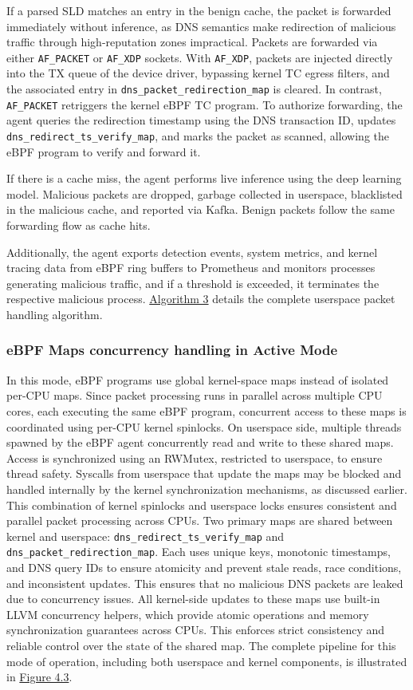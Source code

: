\documentclass [11pt, proquest] {uwthesis}[2020/02/24]
\begin{document}
If a parsed SLD matches an entry in the benign cache, the packet is forwarded immediately without inference, as DNS semantics make redirection of malicious traffic through high-reputation zones impractical. Packets are forwarded via either \texttt{AF\_PACKET} or \texttt{AF\_XDP} sockets. With \texttt{AF\_XDP}, packets are injected directly into the TX queue of the device driver, bypassing kernel TC egress filters, and the associated entry in \texttt{dns\_packet\_redirection\_map} is cleared. In contrast, \texttt{AF\_PACKET} retriggers the kernel eBPF TC program. To authorize forwarding, the agent queries the redirection timestamp using the DNS transaction ID, updates \texttt{dns\_redirect\_ts\_verify\_map}, and marks the packet as scanned, allowing the eBPF program to verify and forward it.

If there is a cache miss, the agent performs live inference using the deep learning model. Malicious packets are dropped, garbage collected in userspace, blacklisted in the malicious cache, and reported via Kafka. Benign packets follow the same forwarding flow as cache hits.

Additionally, the agent exports detection events, system metrics, and kernel tracing data from eBPF ring buffers to Prometheus and monitors processes generating malicious traffic, and if a threshold is exceeded, it terminates the respective malicious process. \hyperref[sec:alg3]{Algorithm 3} details the complete userspace packet handling algorithm.

\subsubsection{\textbf{eBPF Maps concurrency handling in Active Mode}}
\label{active:sec3}
In this mode, eBPF programs use global kernel-space maps instead of isolated per-CPU maps. Since packet processing runs in parallel across multiple CPU cores, each executing the same eBPF program, concurrent access to these maps is coordinated using per-CPU kernel spinlocks. On userspace side, multiple threads spawned by the eBPF agent concurrently read and write to these shared maps. Access is synchronized using an RWMutex, restricted to userspace, to ensure thread safety. Syscalls from userspace that update the maps may be blocked and handled internally by the kernel synchronization mechanisms, as discussed earlier. This combination of kernel spinlocks and userspace locks ensures consistent and parallel packet processing across CPUs. Two primary maps are shared between kernel and userspace: \texttt{dns\_redirect\_ts\_verify\_map} and \texttt{dns\_packet\_redirection\_map}. Each uses unique keys, monotonic timestamps, and DNS query IDs to ensure atomicity and prevent stale reads, race conditions, and inconsistent updates. This ensures that no malicious DNS packets are leaked due to concurrency issues. All kernel-side updates to these maps use built-in LLVM concurrency helpers, which provide atomic operations and memory synchronization guarantees across CPUs. This enforces strict consistency and reliable control over the state of the shared map. The complete pipeline for this mode of operation, including both userspace and kernel components, is illustrated in \hyperref[sec:dp-active-phase]{Figure 4.3}.
\end{document}
